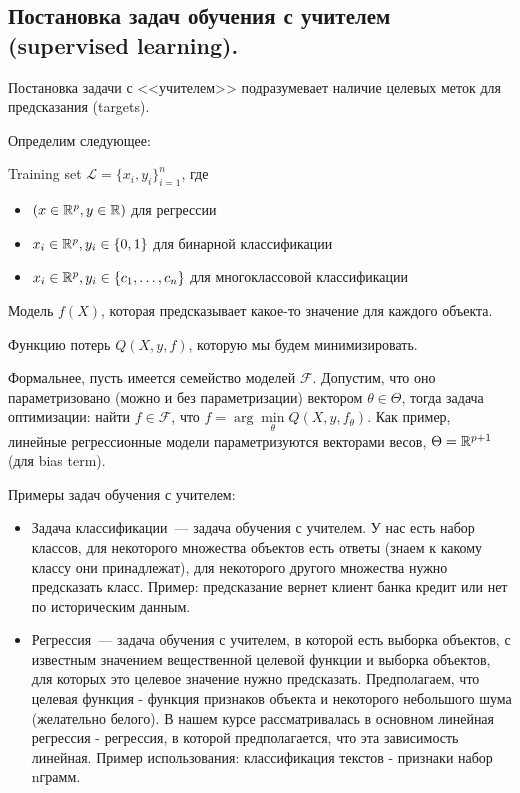 \subsection{Постановка задач обучения с учителем (supervised learning).}

\begin{note}
    Постановка задачи с <<учителем>> подразумевает наличие целевых меток для предсказания (targets).
\end{note}

Определим следующее:

\begin{definition}
    Training set $\mathcal{L} = \{ x_i, y_i \}_{i=1}^{n}$, где

    \begin{itemize}
        \item $(x \in \mathbb{R}^p, y \in \mathbb{R})$ для регрессии
        \item $x_i \in \mathbb{R}^p, y_i \in \{ 0, 1 \}$ для бинарной классификации
        \item $x_i \in \mathbb{R}^p, y_i \in \{ c_1, \ldots, c_n \}$ для многоклассовой классификации
    \end{itemize}
\end{definition}
\begin{definition}
    Модель $f(X)$, которая предсказывает какое-то значение для каждого объекта.
\end{definition}
\begin{definition}
    Функцию потерь $Q(X,y,f)$, которую мы будем минимизировать.
\end{definition}
\begin{note}
    Формальнее, пусть имеется семейство моделей $\mathcal{F}$. Допустим, что оно параметризовано (можно и без параметризации) вектором $\theta \in \Theta$, тогда задача оптимизации: найти $f \in \mathcal{F}$, что $f = \arg\min\limits_{\theta} Q(X, y, f_\theta)$. Как пример, линейные регрессионные модели параметризуются векторами весов, $\Theta = \mathbb{R}^{p + 1}$ (для bias term).
\end{note}

Примеры задач обучения с учителем:

\begin{itemize}
    \item Задача классификации~--- задача обучения с учителем. У нас есть набор классов, для некоторого множества объектов есть ответы (знаем к какому классу они принадлежат), для некоторого другого множества нужно предсказать класс. Пример: предсказание вернет клиент банка кредит или нет по историческим данным.
    \item Регрессия~--- задача обучения с учителем, в которой есть выборка объектов, с известным значением вещественной целевой функции и выборка объектов, для которых это целевое значение нужно предсказать. Предполагаем, что целевая функция - функция признаков объекта и некоторого небольшого шума (желательно белого). В нашем курсе рассматривалась в основном линейная регрессия - регрессия, в которой предполагается, что эта зависимость линейная. Пример использования: классификация текстов - признаки набор nграмм.
\end{itemize}


